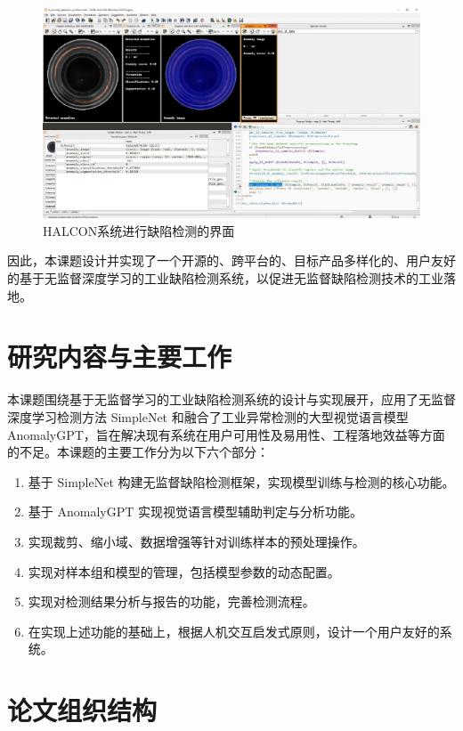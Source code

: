 \documentclass[
  ]{njuthesis}
\begin{document}
\begin{figure}[ht]
  \centering
  \includegraphics[width=\textwidth]{images/HALCON系统界面.png}
  \caption{HALCON系统进行缺陷检测的界面}
  \label{HALCON}
\end{figure}

因此，本课题设计并实现了一个开源的、跨平台的、目标产品多样化的、用户友好的基于无监督深度学习的工业缺陷检测系统，以促进无监督缺陷检测技术的工业落地。

\section{研究内容与主要工作}

本课题围绕基于无监督学习的工业缺陷检测系统的设计与实现展开，应用了无监督深度学习检测方法 SimpleNet 和融合了工业异常检测的大型视觉语言模型 AnomalyGPT，旨在解决现有系统在用户可用性及易用性、工程落地效益等方面的不足。本课题的主要工作分为以下六个部分：  

\begin{enumerate}
    \item 基于 SimpleNet 构建无监督缺陷检测框架，实现模型训练与检测的核心功能。
    \item 基于 AnomalyGPT 实现视觉语言模型辅助判定与分析功能。
    \item 实现裁剪、缩小域、数据增强等针对训练样本的预处理操作。
    \item 实现对样本组和模型的管理，包括模型参数的动态配置。
    \item 实现对检测结果分析与报告的功能，完善检测流程。
    \item 在实现上述功能的基础上，根据人机交互启发式原则，设计一个用户友好的系统。
\end{enumerate}

\section{论文组织结构}
\end{document}
